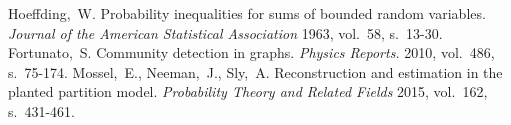 \documentclass[finnish,12pt,a4paper,pdftex,sci,utf8]{aaltothesis}
\begin{document}
\clearpage

\thesisbibliography

\begin{thebibliography}{99}


 Hoeffding,\ W. Probability inequalities for sums of bounded random variables. \textit{Journal of the American Statistical Association} 1963, vol.\ 58, s.\ 13-30.
 Fortunato,\ S. Community detection in graphs. \textit{Physics Reports.} 2010, vol.\ 486, s.\ 75-174.
 Mossel,\ E., Neeman,\ J., Sly,\ A. Reconstruction and estimation in the planted partition model. \textit{Probability Theory and Related Fields} 2015, vol.\ 162, s.\ 431-461.

\end{thebibliography}

\clearpage

\thesisappendix
\end{document}
